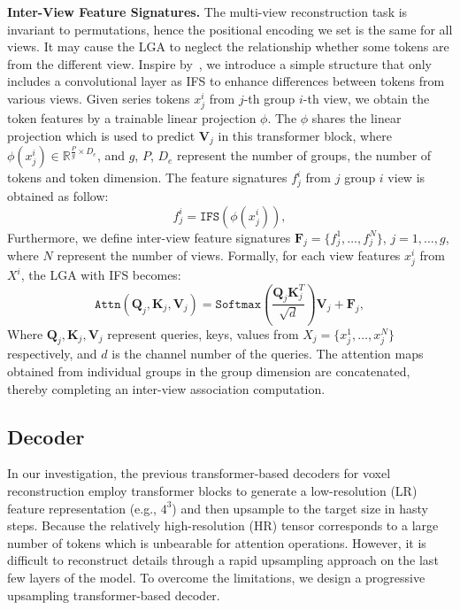 \documentclass[10pt,twocolumn,letterpaper]{article}
\def\mF{{\bm{F}}}
\def\mK{{\bm{K}}}
\def\mQ{{\bm{Q}}}
\def\mV{{\bm{V}}}
\begin{document}
\textbf{Inter-View Feature Signatures.} The multi-view reconstruction task is invariant to permutations, hence the positional encoding we set is the same for all views. It may cause the LGA to neglect the relationship whether some tokens are from the different view. Inspire by~\cite{dong2022cswin}, we introduce a simple structure that only includes a convolutional layer as IFS to enhance differences between tokens from various views. Given series tokens $x_j^i$ from $j$-th group $i$-th view, we obtain the token features by a trainable linear projection $\phi$. The $\phi$ shares the linear projection which is used to predict $\mV_j$ in this transformer block, where $\phi(x_j^i)\in \mathbb{R}^{\frac{P}{g}\times D_e}$, and $g$, $P$, $D_e$ represent the number of groups, the number of tokens and token dimension. The feature signatures $f_j^i$ from $j$ group $i$ view is obtained as follow:
\begin{equation}
  \label{equ:sig}
  f_j^i=\mathtt{IFS}(\phi(x_j^i)),
\end{equation}
Furthermore, we define inter-view feature signatures $\mF_j=\{f_j^1,\ldots,f_j^N\}$, $j=1,\ldots,g$, where $N$ represent the number of views. Formally, for each view features $x_j^i$ from $X^i$, the LGA with IFS becomes:
\begin{equation}
  \label{equ:att}
  \mathtt{Attn}(\mQ_j,\mK_j,\mV_j) = \mathtt{Softmax}(\frac{\mQ_j\mK_j^T}{\sqrt d})\mV_j+\mF_j,
\end{equation}
Where $\mQ_j,\mK_j,\mV_j$ represent queries, keys, values from $X_j=\{x_j^1, \dots ,x_j^N\}$ respectively, and $d$ is the channel number of the queries. The attention maps obtained from individual groups in the group dimension are concatenated, thereby completing an inter-view association computation.


\subsection{Decoder}
In our investigation, the previous transformer-based decoders for voxel reconstruction employ transformer blocks to generate a low-resolution (LR) feature representation (e.g., $4^3$) and then upsample to the target size in hasty steps. Because the relatively high-resolution (HR) tensor corresponds to a large number of tokens which is unbearable for attention operations. However, it is difficult to reconstruct details through a rapid upsampling approach on the last few layers of the model. To overcome the limitations, we design a progressive upsampling transformer-based decoder.
\end{document}
